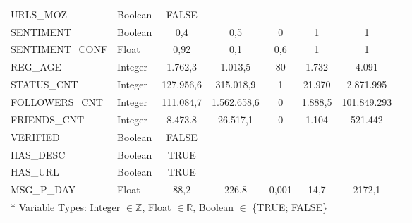 \begin{appendices}
\begin{table}[H]
\begin{center}
{\begin{tabular}{l| lcccccc}
						URLS\_MOZ					& Boolean & FALSE 	  & 			 & 		 & 		   & 			\\
						SENTIMENT					& Boolean & 0,4 	  & 0,5 		 & 0 	 & 1 	   & 1			\\
						SENTIMENT\_CONF				& Float   & 0,92 	  & 0,1 		 & 0,6 	 & 1 	   & 1 			\\
						\hline
						REG\_AGE 					& Integer & 1.762,3   & 1.013,5 	 & 80 	 & 1.732   & 4.091		\\
						STATUS\_CNT 				& Integer & 127.956,6 & 315.018,9    & 1 	 & 21.970  & 2.871.995	\\ 
						FOLLOWERS\_CNT 				& Integer & 111.084,7 & 1.562.658,6  & 0 	 & 1.888,5 & 101.849.293\\ 
						FRIENDS\_CNT				& Integer & 8.473.8   & 26.517,1 	 & 0 	 & 1.104   & 521.442	\\
						VERIFIED					& Boolean & FALSE 	  & 			 & 		 & 		   & 			\\ 
						HAS\_DESC 					& Boolean & TRUE 	  & 			 & 		 & 		   & 			\\ 
						HAS\_URL					& Boolean & TRUE 	  & 			 & 		 & 		   & 			\\ 
						MSG\_P\_DAY 				& Float   & 88,2	  & 226,8 	 	 & 0,001 & 14,7	   & 2172,1		\\ 
						\hline\hline
						\multicolumn{6}{l}{* Variable Types: Integer $ \in \mathbb{Z} $, Float $ \in \mathbb{R} $, Boolean $ \in  $ \{TRUE; FALSE\} }
					\end{tabular}
				}	
			\end{center}
		\end{table}

\end{appendices}